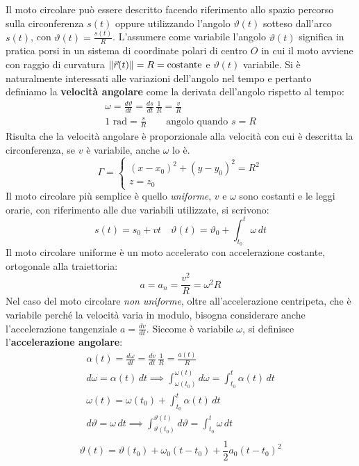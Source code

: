 \documentclass[10pt,a4paper]{book}
\DeclarePairedDelimiter{\norma}{\lVert}{\rVert} %
\begin{document}
Il moto circolare può essere descritto facendo riferimento allo spazio percorso sulla circonferenza $s(t)$ oppure utilizzando l'angolo $\vartheta(t)$ sotteso dall'arco $s(t)$, con $\vartheta (t)=\frac{s(t)}{R}$. L'assumere come variabile l'angolo $\vartheta(t)$ significa in pratica porsi in un sistema di coordinate polari di centro $O$ in cui il moto avviene con raggio di curvatura $\norma{\vec{r}(t)}=R=\text{costante}$ e $\vartheta (t)$ variabile. Si è naturalmente interessati alle variazioni dell'angolo nel tempo e pertanto definiamo la \textbf{velocità angolare} come la derivata dell'angolo rispetto al tempo:
\begin{gather*}
	\omega=\frac{d\vartheta}{dt}=\frac{ds}{dt}\,\frac{1}{R}=\frac{v}{R}\\
	1 \text{ rad}=\frac{s}{R} \qquad \text{angolo quando $s=R$}
\end{gather*}
Risulta che la velocità angolare è proporzionale alla velocità con cui è descritta la circonferenza, se $v$ è variabile, anche $\omega$ lo è.
\[
	\Gamma=
	\begin{cases}
		(x-x_0)^2+(y-y_0)^2=R^2 \\
		z=z_0
	\end{cases}
\]
Il moto circolare più semplice è quello \emph{uniforme}, $v$ e $\omega$ sono costanti e le leggi orarie, con riferimento alle due variabili utilizzate, si scrivono:
\[
	s(t)=s_0+vt \quad \vartheta(t)=\vartheta_0+\int^t_{t_0} \omega\,dt
\]
Il moto circolare uniforme è un moto accelerato con accelerazione costante, ortogonale alla traiettoria:
\[
	a=a_n=\frac{v^2}{R}=\omega^2 R
\]
Nel caso del moto circolare \emph{non uniforme}, oltre all'accelerazione centripeta, che è variabile perché la velocità varia in modulo, bisogna considerare anche l'accelerazione tangenziale $a = \frac{dv}{dt}$. Siccome è variabile $\omega$, si definisce l'\textbf{accelerazione angolare}:
\begin{gather*}
	\alpha(t)=\frac{d\omega}{dt}=\frac{dv}{dt}\,\frac{1}{R}= \frac{a(t)}{R} \\
	d\omega=\alpha(t) \,dt \implies \int^{\omega(t)}_{\omega(t_0)} d\omega=\int^t_{t_0} \alpha(t)\,dt \\
	\omega(t)=\omega(t_0)+\int^t_{t_0}\alpha(t)\,dt \\
	d\vartheta=\omega\,dt \implies \int^{\vartheta(t)}_{\vartheta(t_0)} d\vartheta =\int^t_{t_0}\omega\,dt \\
\end{gather*}
\begin{equation}
	\boxed{\vartheta(t)=\vartheta(t_0)+\omega_0(t-t_0)+\frac{1}{2}a_0(t-t_0)^2}
\end{equation}
\end{document}
